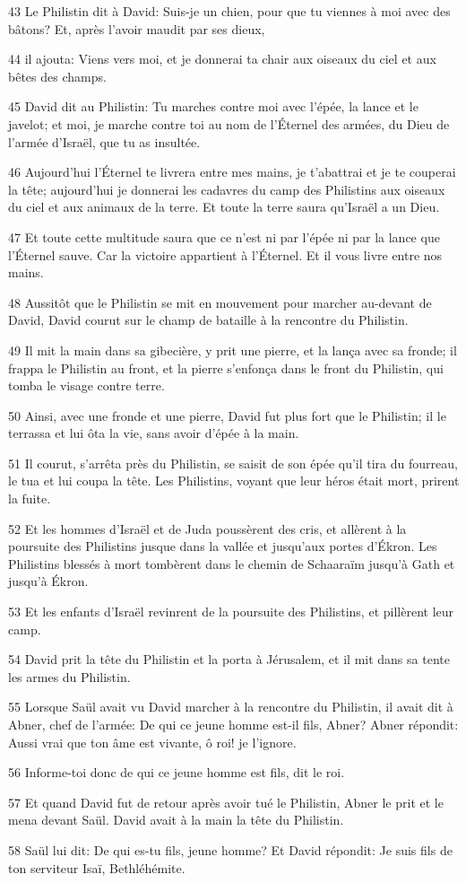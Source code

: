 \par 43 Le Philistin dit à David: Suis-je un chien, pour que tu viennes à moi avec des bâtons? Et, après l'avoir maudit par ses dieux,
\par 44 il ajouta: Viens vers moi, et je donnerai ta chair aux oiseaux du ciel et aux bêtes des champs.
\par 45 David dit au Philistin: Tu marches contre moi avec l'épée, la lance et le javelot; et moi, je marche contre toi au nom de l'Éternel des armées, du Dieu de l'armée d'Israël, que tu as insultée.
\par 46 Aujourd'hui l'Éternel te livrera entre mes mains, je t'abattrai et je te couperai la tête; aujourd'hui je donnerai les cadavres du camp des Philistins aux oiseaux du ciel et aux animaux de la terre. Et toute la terre saura qu'Israël a un Dieu.
\par 47 Et toute cette multitude saura que ce n'est ni par l'épée ni par la lance que l'Éternel sauve. Car la victoire appartient à l'Éternel. Et il vous livre entre nos mains.
\par 48 Aussitôt que le Philistin se mit en mouvement pour marcher au-devant de David, David courut sur le champ de bataille à la rencontre du Philistin.
\par 49 Il mit la main dans sa gibecière, y prit une pierre, et la lança avec sa fronde; il frappa le Philistin au front, et la pierre s'enfonça dans le front du Philistin, qui tomba le visage contre terre.
\par 50 Ainsi, avec une fronde et une pierre, David fut plus fort que le Philistin; il le terrassa et lui ôta la vie, sans avoir d'épée à la main.
\par 51 Il courut, s'arrêta près du Philistin, se saisit de son épée qu'il tira du fourreau, le tua et lui coupa la tête. Les Philistins, voyant que leur héros était mort, prirent la fuite.
\par 52 Et les hommes d'Israël et de Juda poussèrent des cris, et allèrent à la poursuite des Philistins jusque dans la vallée et jusqu'aux portes d'Ékron. Les Philistins blessés à mort tombèrent dans le chemin de Schaaraïm jusqu'à Gath et jusqu'à Ékron.
\par 53 Et les enfants d'Israël revinrent de la poursuite des Philistins, et pillèrent leur camp.
\par 54 David prit la tête du Philistin et la porta à Jérusalem, et il mit dans sa tente les armes du Philistin.
\par 55 Lorsque Saül avait vu David marcher à la rencontre du Philistin, il avait dit à Abner, chef de l'armée: De qui ce jeune homme est-il fils, Abner? Abner répondit: Aussi vrai que ton âme est vivante, ô roi! je l'ignore.
\par 56 Informe-toi donc de qui ce jeune homme est fils, dit le roi.
\par 57 Et quand David fut de retour après avoir tué le Philistin, Abner le prit et le mena devant Saül. David avait à la main la tête du Philistin.
\par 58 Saül lui dit: De qui es-tu fils, jeune homme? Et David répondit: Je suis fils de ton serviteur Isaï, Bethléhémite.

